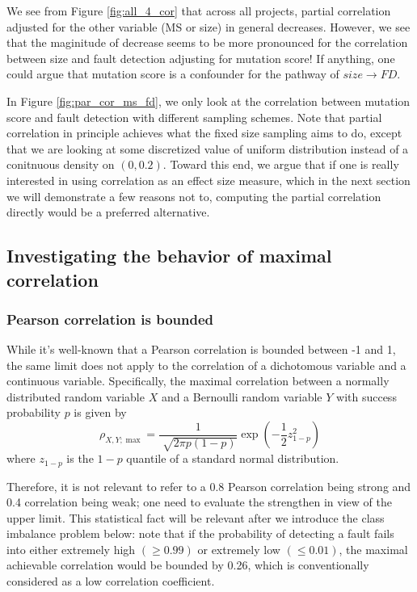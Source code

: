 \documentclass[10pt,letterpaper]{article}
\begin{document}
We see from Figure \ref{fig:all_4_cor} that across all projects, partial correlation adjusted for the other variable (MS or size) in general decreases. However, we see that the maginitude of decrease seems to be more pronounced for the correlation between size and fault detection adjusting for mutation score! If anything, one could argue that mutation score is a confounder for the pathway of $size \to FD$. 

In Figure \ref{fig:par_cor_ms_fd}, we only look at the correlation between mutation score and fault detection with different sampling schemes. Note that partial correlation in principle achieves what the fixed size sampling aims to do, except that we are looking at some discretized value of uniform distribution instead of a conitnuous density on $(0,0.2)$. Toward this end, we argue that if one is really interested in using correlation as an effect size measure, which in the next section we will demonstrate a few reasons not to, computing the partial correlation directly would be a preferred alternative.

\subsection{Investigating the behavior of maximal correlation}

\subsubsection{Pearson correlation is bounded}

While it's well-known that a Pearson correlation is bounded between -1 and 1, the same limit does not apply to the correlation of a dichotomous variable and a continuous variable. Specifically, the maximal correlation between a normally distributed random variable $X$ and a Bernoulli random variable $Y$ with success probability $p$ is given by  
\begin{equation}
\rho_{X,Y;\max} = \frac{1}{\sqrt[]{2\pi p (1-p)}} \exp(-\frac{1}{2}z_{1-p}^2)
\end{equation} where $z_{1-p}$ is the $1-p$ quantile of a standard normal distribution. 

Therefore, it is not relevant to refer to a 0.8 Pearson correlation being strong and 0.4 correlation being weak; one need to evaluate the strengthen in view of the upper limit. This statistical fact will be relevant after we introduce the class imbalance problem below: note that if the probability of detecting a fault fails into either extremely high $(\geq 0.99)$ or extremely low $(\leq 0.01)$, the maximal achievable correlation would be bounded by 0.26, which is conventionally considered as a low correlation coefficient.
\end{document}
